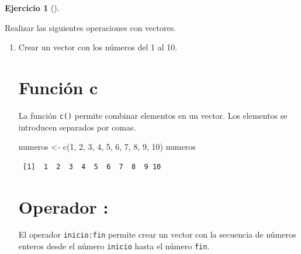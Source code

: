 \documentclass[
  spanish,
  a4paper,
]{scrreport}
\newenvironment{Shaded}{\begin{snugshade}}{\end{snugshade}}
\newcommand{\DecValTok}[1]{\textcolor[rgb]{0.68,0.00,0.00}{#1}}
\newcommand{\FunctionTok}[1]{\textcolor[rgb]{0.28,0.35,0.67}{#1}}
\newcommand{\NormalTok}[1]{\textcolor[rgb]{0.00,0.23,0.31}{#1}}
\newcommand{\OtherTok}[1]{\textcolor[rgb]{0.00,0.23,0.31}{#1}}
\theoremstyle{definition}
\newtheorem{exercise}{Ejercicio}[chapter]
\theoremstyle{remark}
\begin{document}
\begin{exercise}[]\protect\hypertarget{exr-vectores-1}{}\label{exr-vectores-1}

Realizar las siguientes operaciones con vectores.

\begin{enumerate}
\def\labelenumi{\alph{enumi}.}
\item
  Crear un vector con los números del 1 al 10.

  \begin{tcolorbox}[enhanced jigsaw, titlerule=0mm, arc=.35mm, rightrule=.15mm, opacitybacktitle=0.6, leftrule=.75mm, colframe=quarto-callout-tip-color-frame, toptitle=1mm, breakable, colbacktitle=quarto-callout-tip-color!10!white, bottomrule=.15mm, colback=white, left=2mm, bottomtitle=1mm, opacityback=0, title=\textcolor{quarto-callout-tip-color}{\faLightbulb}\hspace{0.5em}{Solución}, toprule=.15mm, coltitle=black]

  \section{Función c}

  La función \texttt{c()} permite combinar elementos en un vector. Los
  elementos se introducen separados por comas.

\begin{Shaded}
\begin{Highlighting}[]
\NormalTok{numeros }\OtherTok{\textless{}{-}} \FunctionTok{c}\NormalTok{(}\DecValTok{1}\NormalTok{, }\DecValTok{2}\NormalTok{, }\DecValTok{3}\NormalTok{, }\DecValTok{4}\NormalTok{, }\DecValTok{5}\NormalTok{, }\DecValTok{6}\NormalTok{, }\DecValTok{7}\NormalTok{, }\DecValTok{8}\NormalTok{, }\DecValTok{9}\NormalTok{, }\DecValTok{10}\NormalTok{)}
\NormalTok{numeros}
\end{Highlighting}
\end{Shaded}

\begin{verbatim}
 [1]  1  2  3  4  5  6  7  8  9 10
\end{verbatim}

  \section{Operador :}

  El operador \texttt{inicio:fin} permite crear un vector con la
  secuencia de números enteros desde el número \texttt{inicio} hasta el
  número \texttt{fin}.


\end{tcolorbox}
\end{enumerate}
\end{exercise}
\end{document}
